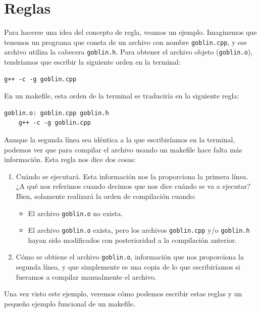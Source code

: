 \documentclass[11pt,twoside,titlepage,a4paper]{article}
\theoremstyle{definition}
\theoremstyle{plain_rojo}
\theoremstyle{remark}
\begin{document}

\section{Reglas}

Para hacerse una idea del concepto de regla, veamos un ejemplo. Imaginemos que
tenemos un programa que consta de un archivo con nombre \texttt{goblin.cpp}, y
ese archivo utiliza la cabecera \texttt{goblin.h}. Para obtener el archivo 
objeto (\texttt{goblin.o}), tendríamos que escribir la siguiente orden en la terminal:
\bigskip
\begin{lstlisting}
g++ -c -g goblin.cpp
\end{lstlisting}
\bigskip
En un makefile, esta orden de la terminal se traduciría en la siguiente regla:
\bigskip\
\begin{lstlisting}
goblin.o: goblin.cpp goblin.h
	g++ -c -g goblin.cpp
\end{lstlisting}
\bigskip
Aunque la segunda línea sea idéntica a la que escribiríamos en la terminal,
podemos ver que para compilar el archivo usando un makefile hace falta más
información. Esta regla nos dice dos cosas:

\begin{enumerate}[font={\color{rojooscuro}\bfseries}]
	\item Cuándo se ejecutará. Esta información nos la proporciona la primera
	línea. ¿A qué nos referimos cuando decimos que nos dice cuándo se va a 
	ejecutar? Bien, solamente realizará la orden de compilación cuando:
	\begin{itemize}[font={\color{rojooscuro}\bfseries}]
		\item El archivo \texttt{goblin.o} no exista.
		\item El archivo \texttt{goblin.o} exista, pero los archivos
		\texttt{goblin.cpp} y/o \texttt{goblin.h} hayan sido modificados con
		posterioridad a la compilación anterior.
	\end{itemize}
	\item Cómo se obtiene el archivo \texttt{goblin.o}, información que nos
	proporciona la segunda línea, y que simplemente es una copia de lo que
	escribiríamos si fueramos a compilar manualmente el archivo.
\end{enumerate}

Una vez visto este ejemplo, veremos cómo podemos escribir estas reglas y un
pequeño ejemplo funcional de un makefile.
\end{document}
